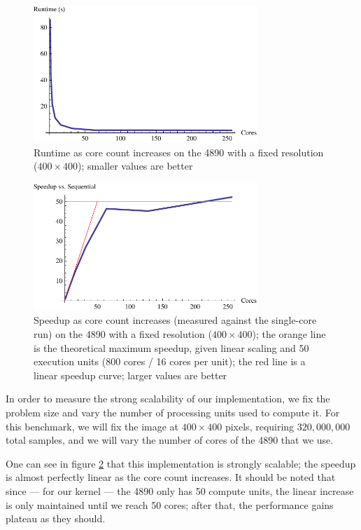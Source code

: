 \documentclass{acmsiggraph}
\begin{document}
\label{strongScaling}

\begin{figure}
    \includegraphics[width=84.5mm]{strongPlotOne.pdf}
    \caption{Runtime as core count increases on the 4890 with a fixed resolution ($400\times400$); smaller values are better}
    \label{fig:strongPlotOne}
\end{figure}

\begin{figure}
    \includegraphics[width=84.5mm]{strongPlotTwo.pdf}
    \caption{Speedup as core count increases (measured against the single-core run) on the 4890 with a fixed resolution ($400\times400$); the orange line is the theoretical maximum speedup, given linear scaling and 50 execution units (800 cores / 16 cores per unit); the red line is a linear speedup curve; larger values are better}
    \label{fig:strongPlotTwo}
\end{figure}

In order to measure the strong scalability of our implementation, we fix the problem size and vary the number of processing units used to compute it. For this benchmark, we will fix the image at $400\times400$ pixels, requiring $320,000,000$ total samples, and we will vary the number of cores of the 4890 that we use.

One can see in figure \ref{fig:strongPlotTwo} that this implementation is strongly scalable; the speedup is almost perfectly linear as the core count increases. It should be noted that since --- for our kernel --- the 4890 only has 50 compute units, the linear increase is only maintained until we reach 50 cores; after that, the performance gains plateau as they should.
\end{document}
